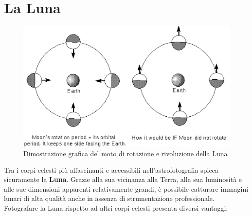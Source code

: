 \section{La Luna} \label{sec:moon}

\begin{figure}[H]
    \centering
    \includegraphics[scale = 0.35]{../assets/moonrota.png}
    \captionsetup{justification=centering}
    \caption{Dimostrazione grafica del moto di rotazione e rivoluzione della Luna \cite{moon_rota}} \label{fig:moonrota}
\end{figure}

Tra i corpi celesti più affascinanti e accessibili nell'astrofotografia spicca sicuramente la \textbf{Luna}. Grazie alla sua vicinanza alla Terra, alla sua luminosità e alle sue dimensioni apparenti relativamente grandi, è possibile catturare immagini lunari di alta qualità anche in assenza di strumentazione professionale. Fotografare la Luna rispetto ad altri corpi celesti presenta diversi vantaggi:

